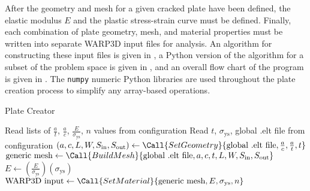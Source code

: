 After the geometry and mesh for a given cracked plate have been defined, the elastic modulus \(E\) and the plastic stress-strain curve must be defined.
Finally, each combination of plate geometry, mesh, and material properties must be written into separate WARP3D input files for analysis.
An algorithm for constructing these input files is given in , a Python version of the algorithm for a subset of the problem space is given in , and an overall flow chart of the program is given in .
The \verb|numpy| numeric Python libraries \cite{numpy} are used throughout the plate creation process to simplify any array-based operations. 
\begin{algorithm}[tbp]
  \caption{Plate Creator}
  \label{alg:plate-creator}
  \begin{algorithmic}
     
    \State Read lists of $\frac{a}{t}$, $\frac{a}{c}$, $\frac{E}{\sigma_{\text{ys}}}$, $n$ values from configuration
    \State {}
    \State Read $t$, $\sigma_\text{ys}$, global .elt file from configuration
    \State {}
      \State $(a, c, L, W, S_{\text{in}}, S_{\text{out}}) \gets \Call{Set Geometry}{\text{global .elt file}, \frac{a}{c}, \frac{a}{t}, t}$
      \State $\text{generic mesh} \gets \Call{Build Mesh}{\text{global .elt file}, a, c, t, L, W, S_{\text{in}}, S_{\text{out}}}$
      \State {}
        \State $E \gets (\frac{E}{\sigma_\text{ys}})(\sigma_\text{ys})$
        \State $\text{WARP3D input} \gets \Call{Set Material}{\text{generic mesh}, E, \sigma_\text{ys}, n}$
        \State {}
      \EndFor
    \EndFor
    \EndProcedure
  \end{algorithmic}
\end{algorithm}
